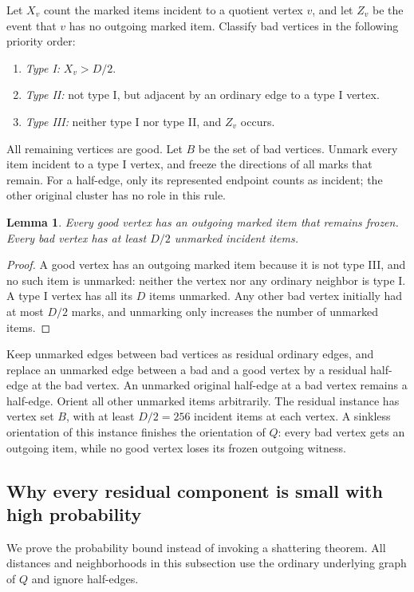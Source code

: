 \documentclass[11pt]{article}
\newtheorem{lemma}[theorem]{Lemma}
\theoremstyle{definition}
\begin{document}
Let $X_v$ count the marked items incident to a quotient vertex $v$, and let
$Z_v$ be the event that $v$ has no outgoing marked item. Classify bad vertices
in the following priority order:
\begin{enumerate}
\item \emph{Type I:} $X_v>D/2$.
\item \emph{Type II:} not type I, but adjacent by an ordinary edge to a
type I vertex.
\item \emph{Type III:} neither type I nor type II, and $Z_v$ occurs.
\end{enumerate}
All remaining vertices are good. Let $B$ be the set of bad vertices. Unmark
every item incident to a type I vertex, and freeze the directions of all
marks that remain. For a half-edge, only its represented endpoint counts
as incident; the other original cluster has no role in this rule.

\begin{lemma}\label{lem:marking}
Every good vertex has an outgoing marked item that remains frozen.
Every bad vertex has at least $D/2$ unmarked incident items.
\end{lemma}
\begin{proof}
A good vertex has an outgoing marked item because it is not type III, and
no such item is unmarked: neither the vertex nor any ordinary neighbor is
type I. A type I vertex has all its $D$ items unmarked. Any other bad vertex
initially had at most $D/2$ marks, and unmarking only increases the number
of unmarked items.
\end{proof}

Keep unmarked edges between bad vertices as residual ordinary edges, and
replace an unmarked edge between a bad and a good vertex by a residual
half-edge at the bad vertex. An unmarked original half-edge at a bad vertex
remains a half-edge. Orient all other unmarked items arbitrarily. The
residual instance has vertex set $B$, with at least $D/2=256$ incident
items at each vertex. A sinkless orientation of this instance finishes the
orientation of $Q$: every bad vertex gets an outgoing item, while no good
vertex loses its frozen outgoing witness.

\subsection{Why every residual component is small with high probability}

We prove the probability bound instead of invoking a shattering theorem.
All distances and neighborhoods in this subsection use the ordinary
underlying graph of $Q$ and ignore half-edges.
\end{document}

